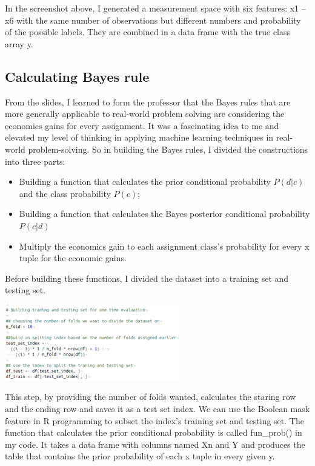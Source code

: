 \documentclass{article}
\begin{document}
\begin{multicols}{2}
In the screenshot above, I generated a measurement space with six features: x1 – x6 with the same number of observations but different numbers and probability of the possible labels. They are combined in a data frame with the true class array y.
\subsection{Calculating Bayes rule}
From the slides, I learned to form the professor that the Bayes rules that are more generally applicable to real-world problem solving are considering the economics gains for every assignment. It was a fascinating idea to me and elevated my level of thinking in applying machine learning techniques in real-world problem-solving. 
So in building the Bayes rules, I divided the constructions into three parts: 
\begin{itemize}
\item Building a function that calculates the prior conditional probability $P(d|c)$ and the class probability $P(c)$;
\item Building a function that calculates the Bayes posterior conditional probability $P(c|d)$
\item Multiply the economics gain to each assignment class's probability for every x tuple for the economic gains.
\end{itemize}
Before building these functions, I divided the dataset into a training set and testing set. 

\includegraphics{fig3.png}

This step, by providing the number of folds wanted, calculates the staring row and the ending row and saves it as a test set index. We can use the Boolean mask feature in R programming to subset the index's training set and testing set.
The function that calculates the prior conditional probability is called fun\_prob() in my code. It takes a data frame with columns named Xn and Y and produces the table that contains the prior probability of each x tuple in every given y.


\end{multicols}
\end{document}
